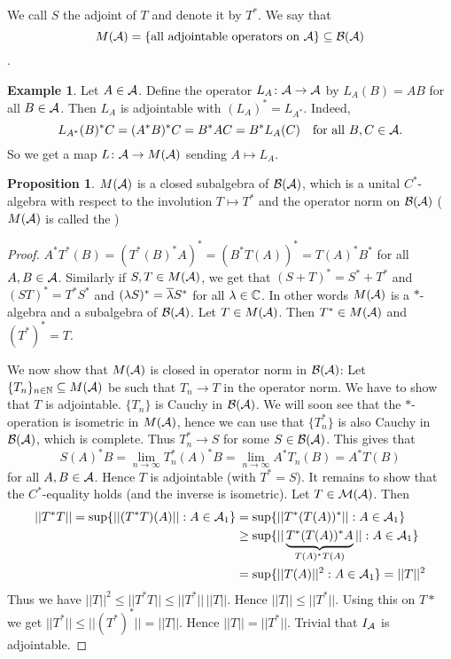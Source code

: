 \documentclass[10pt,english,a4paper]{article}
\theoremstyle{definition}
\newtheorem*{proposition}{Proposition}
\newtheorem*{example}{Example}
\let\emph\relax %
\begin{document}
We call $S$ the adjoint of $T$ and denote it by $T^*$. We say that 
\[M(\mathcal{A}) = \{\text{all adjointable operators on }\mathcal{A}\} \subseteq \mathcal{B}(\mathcal{A})\].

\begin{example}
    Let $A \in \mathcal{A}$. Define the operator $L_A \colon \mathcal{A}\to\mathcal{A}$ by $L_A(B) = AB$
for all $B \in \mathcal{A}$. Then $L_A$ is adjointable with $(L_{A})^* = L_{A^*}$. 
Indeed, 
\[L_{A^*}(B)^*C  = (A^*B)^*C = B^*AC = B^*L_{A}(C)\quad \text{for all } B, C \in \mathcal{A}.\]
So we get a map $L\colon \mathcal{A} \to M(\mathcal{A})$ sending $A \mapsto L_{A}$. 
\end{example}

\begin{proposition}
    $M(\mathcal{A})$ is a closed subalgebra of $\mathcal{B}(\mathcal{A})$, which is a unital $C^*$-algebra 
with respect to the involution $T \mapsto T^*$ and the operator norm on $\mathcal{B}(\mathcal{A})$
($M(\mathcal{A})$ is called the \emph{Multiplier algebra of $\As$})
\end{proposition}
\begin{proof}
$A^*T^*(B) = (T^*(B)^* A)^* = (B^*T(A))^* = T(A)^*B^*$ for all $A,B\in \mathcal{A}$.
Similarly if $S,T \in M(\mathcal{A})$, we get that $(S+T)^* = S^* + T^*$ and 
$(ST)^* = T^*S^*$ and $(\lambda S)^* = \overline{\lambda}S^*$ for all $\lambda \in \mathbb{C}$.
In other words $M(\mathcal{A})$ is a $*$-algebra and a subalgebra of $\mathcal{B}(\mathcal{A})$.
Let $T \in M(\mathcal{A})$. Then $T^* \in M(\mathcal{A})$ and $(T^*)^* = T$.

We now show that $M(\mathcal{A})$ is  closed in operator norm in $\mathcal{B}(\mathcal{A})$:
Let $\{T_n\}_{n\in \mathbb{N}} \subseteq M(\mathcal{A})$ be such that $T_n \to T$ in the operator norm. 
We have to show that $T$ is adjointable. $\{T_n\}$ is Cauchy in $\mathcal{B}(\mathcal{A})$. We will
soon see that the $*$-operation is isometric in $M(\mathcal{A})$, hence we can use 
that $\{T_{n}^{*}\}$ is also Cauchy in $\mathcal{B}(\mathcal{A})$, which is complete. Thus 
$T_{n}^* \to S$ for some $S \in \mathcal{B}(\mathcal{A})$. This gives that 
\[S(A)^*B 
=\lim_{n\to\infty} T_{n}^{*}(A)^*B 
=\lim_{n\to\infty} A^*T_{n}(B) 
= A^*T(B)
\]
for all $A,B \in \mathcal{A}$. Hence $T$ is adjointable (with $T^* = S$). 
It remains to show that the $C^*$-equality holds (and the inverse is
isometric). Let $T \in \mathcal{M}(\mathcal{A})$. Then 
\begin{align*}
||T^*T || = \sup \{ ||(T^*T)(A) || : A \in \mathcal{A}_1\}
&=  \sup \{ ||T^*(T(A))^* || : A \in \mathcal{A}_1\}  \\
&\geq \sup\{ ||\underbrace{T^*(T(A))^*A}_{T(A)^*T(A)} || : A\in \mathcal{A}_1 \} \\
&= \sup\{ ||T(A)||^2 : A \in \mathcal{A}_1 \} = ||T||^2 
\end{align*}
Thus we have $||T||^2 \leq ||T^*T|| \leq ||T^*||\,||T||$.
Hence $||T|| \leq ||T^*||$. Using this on $T*$ we get $||T^*|| \leq ||(T^*)^*|| = ||T||$.
Hence $||T|| = ||T^*||$. Trivial that $I_{\mathcal{A}}$ is adjointable. 

\end{proof}
\end{document}
